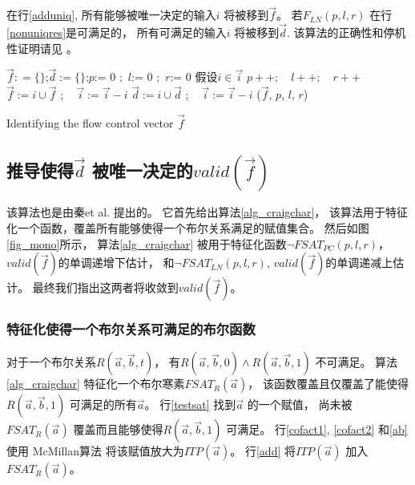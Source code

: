在行\ref{adduniq},
所有能够被唯一决定的输入$i$ 将被移到$\vec{f}$。
若$F_{LN}(p,l,r)$ 在行\ref{nonuniqres}是可满足的，
所有可满足的输入$i$ 将被移到$\vec{d}$.
该算法的正确性和停机性证明请见\cite{QinTODAES15} 。

\begin{algorithm}[t]
\begin{algorithmic}[1]
\STATE $\vec{f}: = \{\}$;$\vec{d}:= \{\}$;$p$:= 0 ;~$l$:= 0 ;~$r$:= 0 \;
\label{while}
  \STATE 假设$i\in\vec{i}$\;
  \STATE $p++$; ~ $l++$; ~ $r++$\;
    \label{adduniq}
    \STATE $\vec{f}:= i\cup\vec{f}$ ; ~
    \STATE $\vec{i}:=\vec{i}-i$\;
  \label{nonuniqres}
    \STATE $\vec{d}:=i\cup\vec{d}$ ; ~
    \STATE $\vec{i}:=\vec{i}-i$
  \ENDIF
\ENDWHILE
\RETURN ($\vec{f}$, $p$, $l$, $r$)
\caption{Identifying the flow control vector $\vec{f}$}
\label{alg_fofc}
\end{algorithmic}
\end{algorithm}





\subsection{推导使得$\vec{d}$ 被唯一决定的$valid(\vec{f})$ }\label{subsec_infer}

该算法也是由秦et al. \cite{QinTODAES15}提出的。
它首先给出算法\ref{alg_craigchar}，
该算法用于特征化一个函数，覆盖所有能够使得一个布尔关系满足的赋值集合。
然后如图\ref{fig_mono}所示，
算法\ref{alg_craigchar} 被用于特征化函数$\neg FSAT_{PC}(p,l,r)$，
$valid(\vec{f})$的单调递增下估计，
和$\neg FSAT_{LN}(p,l,r)$,
$valid(\vec{f})$的单调递减上估计。
最终我们指出这两者将收敛到$valid(\vec{f})$。



\subsubsection{特征化使得一个布尔关系可满足的布尔函数}\label{subsubsec_craig}

对于一个布尔关系$R(\vec{a},\vec{b},t)$，
有$R(\vec{a},\vec{b},0)\wedge R(\vec{a},\vec{b},1)$ 不可满足。
算法\ref{alg_craigchar} 特征化一个布尔寒素$FSAT_R(\vec{a})$，
该函数覆盖且仅覆盖了能使得
$R(\vec{a},\vec{b},1)$ 可满足的所有$\vec{a}$。
行\ref{testsat} 找到$\vec{a}$ 的一个赋值，
尚未被 $FSAT_R(\vec{a})$ 覆盖而且能够使得$R(\vec{a},\vec{b},1)$ 可满足。
行\ref{cofact1}, \ref{cofact2} 和\ref{ab} 使用
McMillan算法\cite{interp_McMillan} 将该赋值放大为$ITP(\vec{a})$。
行\ref{add} 将$ITP(\vec{a})$ 加入$FSAT_R(\vec{a})$。


